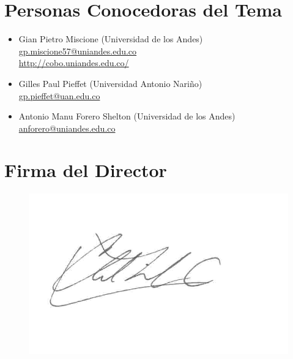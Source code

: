 \documentclass[12pt]{article}
\begin{document}
\section{Personas Conocedoras del Tema}


\begin{itemize}
\item Gian Pietro Miscione (Universidad de los Andes)\\
\href{mailto:gp.miscione57@uniandes.edu.co}{gp.miscione57@uniandes.edu.co}\\
\href{http://cobo.uniandes.edu.co/}{http://cobo.uniandes.edu.co/}
\item Gilles Paul Pieffet
 (Universidad Antonio Nariño)\\
\href{mailto:gp.pieffet@uan.edu.co}{gp.pieffet@uan.edu.co}
\item Antonio Manu Forero Shelton (Universidad de los Andes)\\
\href{mailto:anforero@uniandes.edu.co}{anforero@uniandes.edu.co}
\end{itemize}



\section*{Firma del Director}
\vspace{1.5cm}
\begin{figure}[h]
\begin{center}
    \includegraphics[scale=0.6]{firma.jpg}
  \label{fig:firma}
\end{center}
\end{figure}
\end{document}
